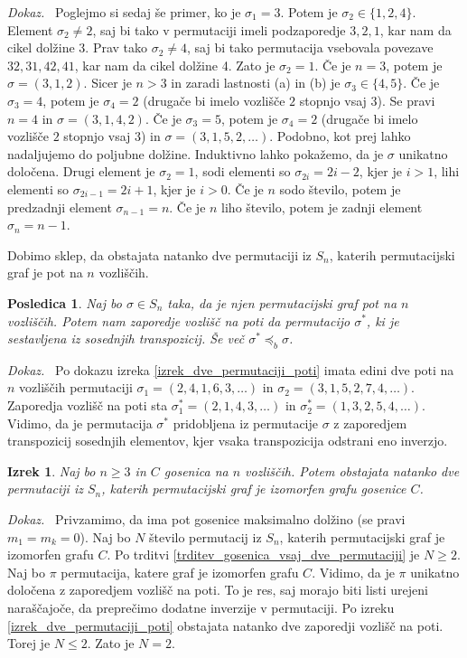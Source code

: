 \documentclass[a4paper, 12pt]{book}
\newtheorem{izrek}{Izrek}[chapter]
\newtheorem{posledica}{Posledica}[chapter]
\newenvironment{dokaz}{\emph{Dokaz.}\ }{\hspace{\fill}{$\Box$}}
\begin{document}
\begin{dokaz}
    Poglejmo si sedaj še primer, ko je $\sigma_1 = 3$. Potem je $\sigma_2 \in \{ 1, 2, 4\}$. Element $\sigma_2 \neq 2$, saj bi tako v permutaciji imeli podzaporedje $3, 2, 1$, kar nam da cikel dolžine 3. Prav tako $\sigma_2 \neq 4$, saj bi tako permutacija vsebovala povezave $32, 31, 42, 41$, kar nam da cikel dolžine 4. Zato je $\sigma_2 = 1$. Če je $n = 3$, potem je $\sigma = (3, 1, 2)$. Sicer je $n > 3$ in zaradi lastnosti (a) in (b) je $\sigma_3 \in \{ 4, 5 \}$. Če je $\sigma_3 = 4$, potem je $\sigma_4 = 2$ (drugače bi imelo vozlišče $2$ stopnjo vsaj $3$). Se pravi $n = 4$ in $\sigma = (3, 1, 4, 2)$. Če je $\sigma_3 = 5$, potem je $\sigma_4 = 2$ (drugače bi imelo vozlišče $2$ stopnjo vsaj $3$) in $\sigma = (3, 1, 5, 2,\dots)$. Podobno, kot prej lahko nadaljujemo do poljubne dolžine. Induktivno lahko pokažemo, da je $\sigma$ unikatno določena. Drugi element je $\sigma_2 = 1$, sodi elementi so $\sigma_{2i} = 2i - 2$, kjer je $i > 1$, lihi elementi so $\sigma_{2i - 1} = 2i + 1$, kjer je $i > 0$. Če je $n$ sodo število, potem je predzadnji element $\sigma_{n-1} = n$. Če je $n$ liho število, potem je zadnji element $\sigma_n = n-1$. 

    Dobimo sklep, da obstajata natanko dve permutaciji iz $S_n$, katerih permutacijski graf je pot na $n$ vozliščih.
\end{dokaz}

\begin{posledica}
    Naj bo $\sigma \in S_n$ taka, da je njen permutacijski graf pot na $n$ vozliščih. Potem nam zaporedje vozlišč na poti da permutacijo $\sigma^*$, ki je sestavljena iz sosednjih transpozicij. Še več $\sigma^* \preceq_b \sigma$.
\end{posledica}
\begin{dokaz}
    Po dokazu izreka \ref{izrek_dve_permutaciji_poti} imata edini dve poti na $n$ vozliščih permutaciji $\sigma_1 = (2, 4, 1, 6, 3,\dots)$ in $\sigma_2 = (3, 1, 5, 2, 7, 4,\dots)$. Zaporedja vozlišč na poti sta $\sigma_1^* = (2, 1, 4, 3,\dots)$ in $\sigma_2^* = (1, 3, 2, 5, 4,\dots)$. Vidimo, da je permutacija $\sigma^*$ pridobljena iz permutacije $\sigma$ z zaporedjem transpozicij sosednjih elementov, kjer vsaka transpozicija odstrani eno inverzjo.
\end{dokaz}

\begin{izrek}    
    Naj bo $n \geq 3$ in $C$ gosenica na $n$ vozliščih. Potem obstajata natanko dve permutaciji iz $S_n$, katerih permutacijski graf je izomorfen grafu gosenice $C$.
\end{izrek}
\begin{dokaz}
    Privzamimo, da ima pot gosenice maksimalno dolžino (se pravi $m_1 = m_k = 0$). Naj bo $N$ število permutacij iz $S_n$, katerih permutacijski graf je izomorfen grafu $C$. Po trditvi \ref{trditev_gosenica_vsaj_dve_permutaciji} je $N \geq 2$. Naj bo $\pi$ permutacija, katere graf je izomorfen grafu $C$. Vidimo, da je $\pi$ unikatno določena z zaporedjem vozlišč na poti. To je res, saj morajo biti listi urejeni naraščajoče, da preprečimo dodatne inverzije v permutaciji. Po izreku \ref{izrek_dve_permutaciji_poti} obstajata natanko dve zaporedji vozlišč na poti. Torej je $N \leq 2$. Zato je $N = 2$.
\end{dokaz}
\end{document}
